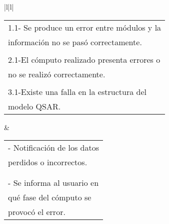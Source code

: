 \begin{longtable}{|l|l|}
\begin{tabular}[c]{@{}l@{}}1.1- Se produce un error entre módulos y la  \\ información no se pasó correctamente.\\ \\  2.1-El cómputo realizado presenta errores o\\ no se realizó correctamente.\\ \\ 3.1-Existe una falla en la estructura del\\ modelo QSAR.\end{tabular} & \begin{tabular}[c]{@{}l@{}}- Notificación de los datos \\ perdidos o incorrectos.\\ \\ \\ - Se informa al usuario en \\ qué fase del cómputo se \\ provocó el error.\end{tabular}                                       \\ \hline
{}                                                                                                                                                                                                                                                                                                                                                                                                              \\ \hline
{}                                                                                                                                                                                                                                                                                                                                                     \\ \hline
{}                                                                                                                                                                                                                                                                                                              \\ \hline

\end{longtable}
